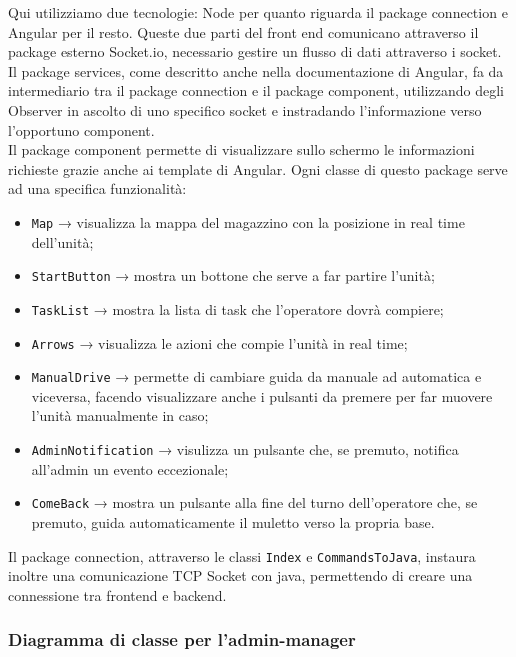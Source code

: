 Qui utilizziamo due tecnologie: Node per quanto riguarda il package connection e Angular per il resto. Queste due parti del front end comunicano attraverso il package esterno Socket.io, necessario gestire un flusso di dati attraverso i socket.\\
Il package services, come descritto anche nella documentazione di Angular, fa da intermediario tra il package connection e il package component, utilizzando degli Observer in ascolto di uno specifico socket e instradando l'informazione verso l'opportuno component.\\
Il package component permette di visualizzare sullo schermo le informazioni richieste grazie anche ai template di Angular. Ogni classe di questo package serve ad una specifica funzionalità:
\begin{itemize}
	\item \texttt{Map} → visualizza la mappa del magazzino con la posizione in real time dell'unità;
	\item \texttt{StartButton} → mostra un bottone che serve a far partire l'unità;
	\item \texttt{TaskList} → mostra la lista di task che l'operatore dovrà compiere;
	\item \texttt{Arrows} → visualizza le azioni che compie l'unità in real time;
	\item \texttt{ManualDrive} → permette di cambiare guida da manuale ad automatica e viceversa, facendo visualizzare anche i pulsanti da premere per far muovere l'unità manualmente in caso;
	\item \texttt{AdminNotification} → visulizza un pulsante che, se premuto, notifica all'admin un evento eccezionale;
	\item \texttt{ComeBack} → mostra un pulsante alla fine del turno dell'operatore che, se premuto, guida automaticamente il muletto verso la propria base.
\end{itemize}
Il package connection, attraverso le classi \texttt{Index} e \texttt{CommandsToJava}, instaura inoltre una comunicazione TCP Socket con java, permettendo di creare una connessione tra frontend e backend.\\

\subsubsection{Diagramma di classe per l'admin-manager}

